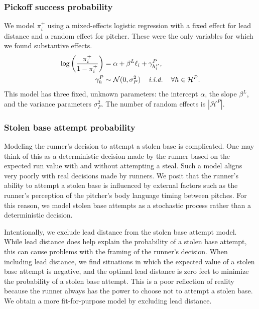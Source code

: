 \documentclass{article}
\begin{document}
      \subsubsection{Pickoff success probability}
      \label{sec:prob-po-success}

        We model $\pi_i^+$ using a mixed-effects logistic regression with a fixed effect for lead distance and a random effect for pitcher. These were the only variables for which we found substantive effects.
        \begin{align}
          \label{eqn:prob-po-success}
          \begin{split}
            \log\left(\frac{\pi_i^+}{1 - \pi_i^+}\right) &= \alpha + \beta^L \ell_i + \gamma^P_{h_i^P},\\
            \gamma^P_{h} &\sim \mathcal{N}(0, \sigma^2_P) \hspace{4mm} \mbox{\it i.i.d.} \hspace{4mm} \forall h \in \mathcal{H}^P.
          \end{split}
        \end{align}
        This model has three fixed, unknown parameters: the intercept $\alpha$, the slope $\beta^L$, and the variance parameters $\sigma^2_P$. The number of random effects is $|\mathcal{H}^P|$.

      \subsubsection{Stolen base attempt probability}
      \label{sec:prob-so-attempt}

        Modeling the runner's decision to attempt a stolen base is complicated. One may think of this as a deterministic decision made by the runner based on the expected run value with and without attempting a steal. Such a model aligns very poorly with real decisions made by runners. We posit that the runner's ability to attempt a stolen base is influenced by external factors such as the runner's perception of the pitcher's body language timing between pitches. For this reason, we model stolen base attempts as a stochastic process rather than a deterministic decision.

        Intentionally, we exclude lead distance from the stolen base attempt model. While lead distance does help explain the probability of a stolen base attempt, this can cause problems with the framing of the runner's decision. When including lead distance, we find situations in which the expected value of a stolen base attempt is negative, and the optimal lead distance is zero feet to minimize the probability of a stolen base attempt. This is a poor reflection of reality because the runner always has the power to choose not to attempt a stolen base. We obtain a more fit-for-purpose model by excluding lead distance.
\end{document}

